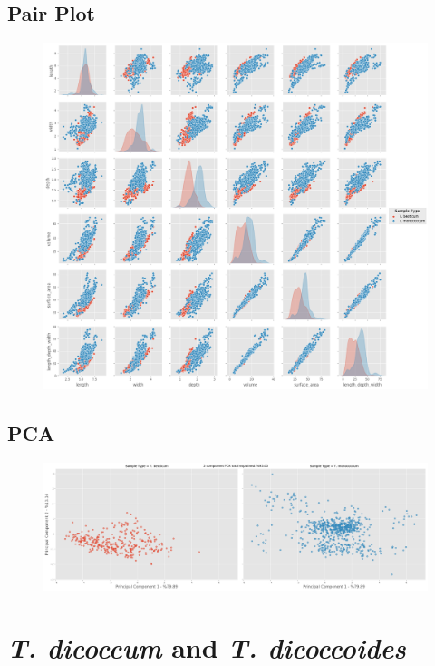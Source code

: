 \documentclass[11pt]{report}
\begin{document}
\subsection{Pair Plot}
\label{sec:org6de8a23}

\begin{figure}[htbp]
\centering
\includegraphics[width=18cm]{./images/results/group1/pairplot.png}
\label{fig:org47f587d}
\end{figure}

\clearpage
\subsection{PCA}
\label{sec:org81f7caf}
\begin{figure}[htbp]
\centering
\includegraphics[width=18cm]{./images/results/group1/pca.png}
\label{fig:orga9da4f8}
\end{figure}

\clearpage
\section{\emph{T. dicoccum} and \emph{T. dicoccoides}}
\label{sec:org32da199}
\end{document}
